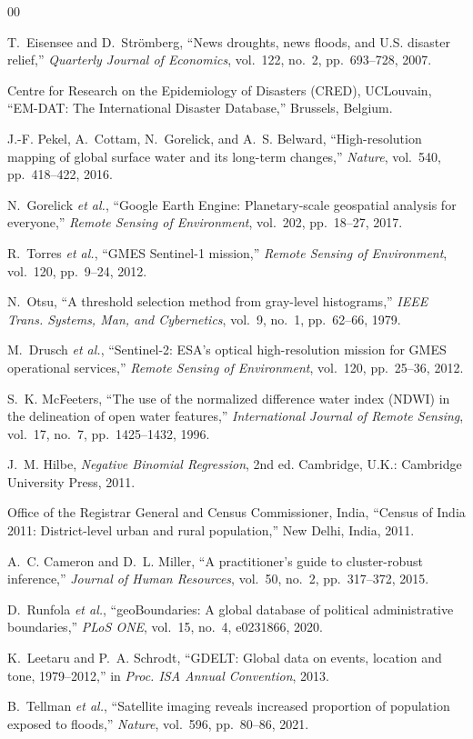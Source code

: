 \documentclass[conference]{IEEEtran}
\begin{document}
\begin{thebibliography}{00}

 T.~Eisensee and D.~Str\"omberg, ``News droughts, news
floods, and U.S. disaster relief,'' \emph{Quarterly Journal of Economics},
vol.~122, no.~2, pp.~693--728, 2007.

 Centre for Research on the Epidemiology of Disasters (CRED),
UCLouvain, ``EM-DAT: The International Disaster Database,'' Brussels, Belgium.

 J.-F. Pekel, A.~Cottam, N.~Gorelick, and A.~S. Belward,
``High-resolution mapping of global surface water and its long-term changes,''
\emph{Nature}, vol.~540, pp.~418--422, 2016.

 N.~Gorelick \emph{et al.}, ``Google Earth Engine:
Planetary-scale geospatial analysis for everyone,'' \emph{Remote Sensing of
Environment}, vol.~202, pp.~18--27, 2017.

 R.~Torres \emph{et al.}, ``GMES Sentinel-1 mission,''
\emph{Remote Sensing of Environment}, vol.~120, pp.~9--24, 2012.

 N.~Otsu, ``A threshold selection method from gray-level
histograms,'' \emph{IEEE Trans. Systems, Man, and Cybernetics}, vol.~9, no.~1,
pp.~62--66, 1979.

 M.~Drusch \emph{et al.}, ``Sentinel-2: ESA's optical
high-resolution mission for GMES operational services,'' \emph{Remote Sensing of
Environment}, vol.~120, pp.~25--36, 2012.

 S.~K. McFeeters, ``The use of the normalized difference
water index (NDWI) in the delineation of open water features,''
\emph{International Journal of Remote Sensing}, vol.~17, no.~7, pp.~1425--1432,
1996.

 J.~M. Hilbe, \emph{Negative Binomial Regression}, 2nd ed.
Cambridge, U.K.: Cambridge University Press, 2011.

 Office of the Registrar General and Census Commissioner,
India, ``Census of India 2011: District-level urban and rural population,'' New
Delhi, India, 2011.

 A.~C. Cameron and D.~L. Miller, ``A practitioner's guide
to cluster-robust inference,'' \emph{Journal of Human Resources}, vol.~50,
no.~2, pp.~317--372, 2015.

 D.~Runfola \emph{et al.}, ``geoBoundaries: A global
database of political administrative boundaries,'' \emph{PLoS ONE}, vol.~15,
no.~4, e0231866, 2020.

 K.~Leetaru and P.~A. Schrodt, ``GDELT: Global data on
events, location and tone, 1979--2012,'' in \emph{Proc. ISA Annual Convention},
2013.

 B.~Tellman \emph{et al.}, ``Satellite imaging reveals
increased proportion of population exposed to floods,'' \emph{Nature}, vol.~596,
pp.~80--86, 2021.

\end{thebibliography}
\end{document}
